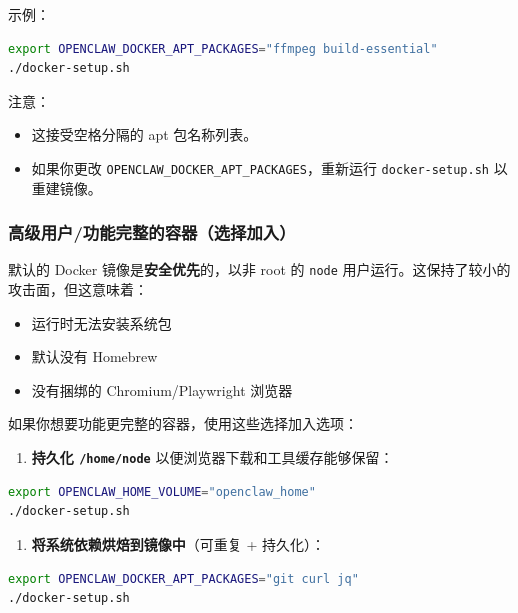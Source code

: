 示例：

\begin{lstlisting}[language=bash]
export OPENCLAW_DOCKER_APT_PACKAGES="ffmpeg build-essential"
./docker-setup.sh
\end{lstlisting}


注意：

\begin{itemize}
  \item 这接受空格分隔的 apt 包名称列表。
  \item 如果你更改 \texttt{OPENCLAW\_DOCKER\_APT\_PACKAGES}，重新运行 \texttt{docker-setup.sh} 以重建镜像。
\end{itemize}


\subsubsection{高级用户/功能完整的容器（选择加入）}


默认的 Docker 镜像是\textbf{安全优先}的，以非 root 的 \texttt{node} 用户运行。这保持了较小的攻击面，但这意味着：

\begin{itemize}
  \item 运行时无法安装系统包
  \item 默认没有 Homebrew
  \item 没有捆绑的 Chromium/Playwright 浏览器
\end{itemize}


如果你想要功能更完整的容器，使用这些选择加入选项：

\begin{enumerate}
  \item \textbf{持久化 \texttt{/home/node}} 以便浏览器下载和工具缓存能够保留：
\end{enumerate}


\begin{lstlisting}[language=bash]
export OPENCLAW_HOME_VOLUME="openclaw_home"
./docker-setup.sh
\end{lstlisting}


\begin{enumerate}
  \item \textbf{将系统依赖烘焙到镜像中}（可重复 + 持久化）：
\end{enumerate}


\begin{lstlisting}[language=bash]
export OPENCLAW_DOCKER_APT_PACKAGES="git curl jq"
./docker-setup.sh
\end{lstlisting}


